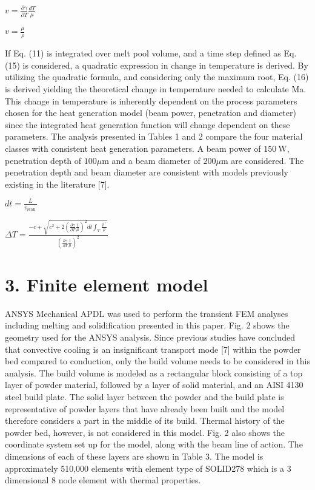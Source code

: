\documentclass[10pt]{article}
\begin{document}
$v=\frac{\partial \gamma}{\partial T} \frac{d T}{\mu}$

$v=\frac{\mu}{\rho}$

If Eq. (11) is integrated over melt pool volume, and a time step defined as Eq. (15) is considered, a quadratic expression in change in temperature is derived. By utilizing the quadratic formula, and considering only the maximum root, Eq. (16) is derived yielding the theoretical change in temperature needed to calculate Ma. This change in temperature is inherently dependent on the process parameters chosen for the heat generation model (beam power, penetration and diameter) since the integrated heat generation function will change dependent on these parameters. The analysis presented in Tables 1 and 2 compare the four material classes with consistent heat generation parameters. A beam power of $150 \mathrm{~W}$, penetration depth of $100 \mu \mathrm{m}$ and a beam diameter of $200 \mu \mathrm{m}$ are considered. The penetration depth and beam diameter are consistent with models previously existing in the literature [7].

$d t=\frac{L}{v_{\text {scan }}}$

$\Delta T=\frac{-c+\sqrt{c^{2}+2\left(\frac{\partial \gamma}{\partial T} \frac{1}{\mu}\right)^{2} d t \int_{V} \frac{q^{\prime \prime \prime}}{\rho}}}{\left(\frac{\partial \gamma}{\partial T} \frac{1}{\mu}\right)^{2}}$

\section*{3. Finite element model}
ANSYS Mechanical APDL was used to perform the transient FEM analyses including melting and solidification presented in this paper. Fig. 2 shows the geometry used for the ANSYS analysis. Since previous studies have concluded that convective cooling is an insignificant transport mode [7] within the powder bed compared to conduction, only the build volume needs to be considered in this analysis. The build volume is modeled as a rectangular block consisting of a top layer of powder material, followed by a layer of solid material, and an AISI 4130 steel build plate. The solid layer between the powder and the build plate is representative of powder layers that have already been built and the model therefore considers a part in the middle of its build. Thermal history of the powder bed, however, is not considered in this model. Fig. 2 also shows the coordinate system set up for the model, along with the beam line of action. The dimensions of each of these layers are shown in Table 3. The model is approximately 510,000 elements with element type of SOLID278 which is a 3 dimensional 8 node element with thermal properties.
\end{document}
